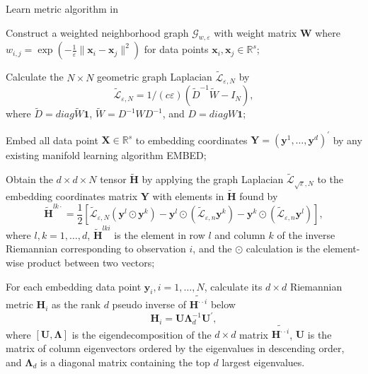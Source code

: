 \documentclass[12pt]{article}
\begin{document}
\begin{algorithm}[!htb]
  \caption{Learn metric algorithm in \cite{Perrault-Joncas2013-pq} }
  \label{alg:learnmetric}
  \DontPrintSemicolon
  \SetAlgoLined
  \BlankLine
  \begin{algorithmic}[1]

  \STATE Construct a weighted neighborhood graph $\mathcal{G}_{w,\varepsilon}$ with weight matrix $\bm{W}$ where $w_{i,j}=\exp(-\frac{1}{\varepsilon}\|\bm{x}_i-\bm{x}_j\|^2)$ for data points $\bm{x}_i,\bm{x}_j \in \mathbb{R}^s$;

  \STATE Calculate the $N\times N$ geometric graph Laplacian $\widetilde{\mathcal{L}}_{\varepsilon,N}$ by
  $$
  \widetilde{\mathcal{L}}_{\varepsilon,N} = 1/(c\varepsilon)(\widetilde{D}^{-1} \widetilde{W} - I_N),
  $$
  where $\widetilde{D}=diag{\widetilde{W}\bm{1}}$, $\widetilde{W} = D^{-1}WD^{-1}$, and $D = diag{W\bm{1}}$;

  \STATE Embed all data point $\bm{X}\in \mathbb{R}^s$ to embedding coordinates $\bm{Y}=(\bm{y}^1,\dots,\bm{y}^d)^\prime$ by any existing manifold learning algorithm EMBED;

  \STATE Obtain the $d\times d\times N$ tensor $\bm{\tilde{H}}$ by applying the graph Laplacian $\widetilde{\mathcal{L}}_{\sqrt{\varepsilon},N}$ to the embedding coordinates matrix $\bm{Y}$ with elements in $\bm{\tilde{H}}$ found by
  $$
    \bm{\tilde{H}}^{lk \cdot} = \frac{1}{2} \left[\tilde{\mathcal{L}}_{\varepsilon, N}\left(\bm{y}^l \odot \bm{y}^k\right) - \bm{y}^l \odot\left(\tilde{\mathcal{L}}_{\varepsilon, n} \bm{y}^k\right) - \bm{y}^k \odot\left(\tilde{\mathcal{L}}_{\varepsilon, n} \bm{y}^l\right)\right],
  $$
  where $l,k=1,\dots,d$, $\bm{\tilde{H}}^{lki}$ is the element in row $l$ and column $k$ of the inverse Riemannian corresponding to observation $i$, and the $\odot$ calculation is the element-wise product between two vectors;

  \STATE For each embedding data point $\bm{y}_i, i=1,\dots,N$, calculate its $d\times d$ Riemannian metric $\bm{H}_i$ as the rank $d$ pseudo inverse of $\tilde{\bm{H}^{\cdot\cdot i}}$ below
  $$
    \bm{H}_i = \bm{U} \bm{\Lambda}_d^{-1} \bm{U}^\prime,
  $$
  where $[\bm{U}, \bm{\Lambda}]$ is the eigendecomposition of the $d\times d$ matrix $\tilde{\bm{H}^{\cdot\cdot i}}$, $\bm{U}$ is the matrix of column eigenvectors ordered by the eigenvalues in descending order, and $\bm{\Lambda}_d$ is a diagonal matrix containing the top $d$ largest eigenvalues.

  \end{algorithmic}
\end{algorithm}
\end{document}
